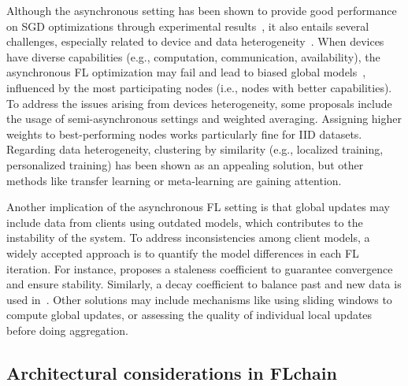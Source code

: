 \documentclass[10pt,journal,compsoc]{IEEEtran}
\begin{document}
Although the asynchronous setting has been shown to provide good performance on SGD optimizations through experimental results~\cite{xie2019asynchronous, sprague2018asynchronous, chen2020asynchronous}, it also entails several challenges, especially related to device and data heterogeneity~\cite{xu2021asynchronous}. When devices have diverse capabilities (e.g., computation, communication, availability), the asynchronous FL optimization may fail and lead to biased global models~\cite{chen2020asynchronous}, influenced by the most participating nodes (i.e., nodes with better capabilities). To address the issues arising from devices heterogeneity, some proposals include the usage of semi-asynchronous settings and weighted averaging. Assigning higher weights to best-performing nodes works particularly fine for IID datasets. Regarding data heterogeneity, clustering by similarity (e.g., localized training, personalized training) has been shown as an appealing solution, but other methods like transfer learning or meta-learning are gaining attention. %

Another implication of the asynchronous FL setting is that global updates may include data from clients using outdated models, which contributes to the instability of the system. To address inconsistencies among client models, a widely accepted approach is to quantify the model differences in each FL iteration. For instance, \cite{xie2019asynchronous} proposes a staleness coefficient to guarantee convergence and ensure stability. Similarly, a decay coefficient to balance past and new data is used in~\cite{chen2020asynchronous}. Other solutions may include mechanisms like using sliding windows to compute global updates, or assessing the quality of individual local updates before doing aggregation. 

\subsection{Architectural considerations in FLchain}
\label{section:architectural_considerations}

\end{document}
